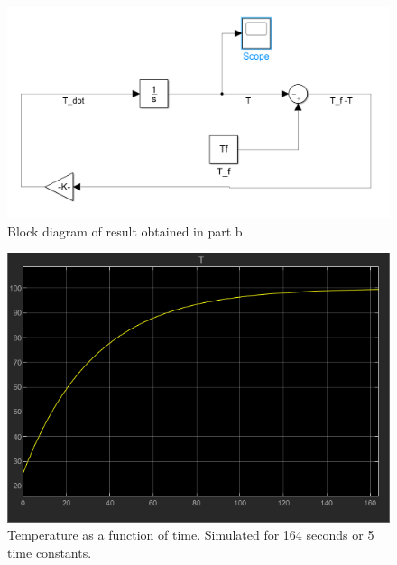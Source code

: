 \documentclass[12pt]{article}
\numberwithin{equation}{subsection}
\begin{document}
  \begin{figure}
    \centering
    \includegraphics[width=\textwidth]{figures/simulink.png}
    \caption{Block diagram of result obtained in part b}
    \label{fig:simulink}
  \end{figure}

  \begin{figure}
    \centering
    \includegraphics[width=\textwidth]{figures/scopesnip}
    \caption{Temperature as a function of time. Simulated for 164 seconds or 5 time constants.}
    \label{fig:scope}
  \end{figure}
\end{document}
